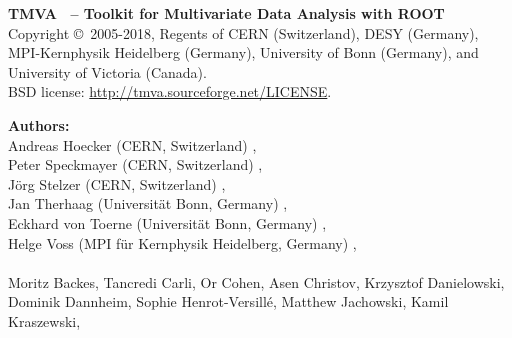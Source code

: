 \begin{center}
{\small\sf
{\sf\bfseries TMVA \TMVAVersion\ -- Toolkit for Multivariate Data Analysis with ROOT}  \\
Copyright 
\copyright\  2005-2018, Regents of 
CERN (Switzerland),  
DESY (Germany),
MPI-Kernphysik Heidelberg (Germany),
University of Bonn (Germany),
and University of Victoria (Canada). \\
BSD license: \url{http://tmva.sourceforge.net/LICENSE}. 

{\sf\bfseries Authors:} \\
Andreas Hoecker (CERN, Switzerland) , \\
Peter Speckmayer (CERN, Switzerland) , \\
J\"org Stelzer (CERN, Switzerland) ,\\
Jan Therhaag (Universit\"at Bonn, Germany) , \\
Eckhard von Toerne (Universit\"at Bonn, Germany) ,\\
Helge Voss (MPI f\"ur Kernphysik Heidelberg, Germany) ,\\
\hspace{0.5cm} \\
Moritz Backes, %
Tancredi Carli, %
Or Cohen, %
Asen Christov, %
Krzysztof Danielowski, %
Dominik Dannheim, %
Sophie Henrot-Versill\'e, %
Matthew Jachowski, %
Kamil Kraszewski, %
}
\end{center}
